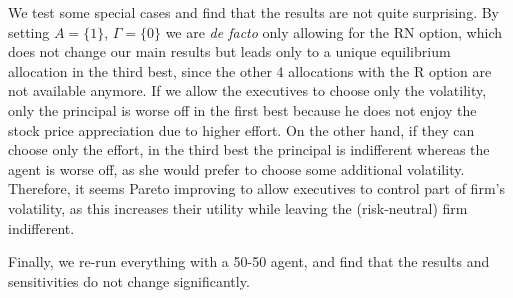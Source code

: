 We test some special cases and find that the results are not quite surprising. By setting $A=\{1\}$, $\Gamma=\{0\}$ we are \textit{de facto} only allowing for the RN option, which does not change our main results but leads only to a unique equilibrium allocation in the third best, since the other 4 allocations with the R option are not available anymore. If we allow the executives to choose only the volatility, only the principal is worse off in the first best because he does not enjoy the stock price appreciation due to higher effort. On the other hand, if they can choose only the effort,  in the third best the principal is indifferent whereas the agent is worse off, as she would prefer to choose some additional volatility. Therefore, it seems Pareto improving to allow executives to control part of firm's volatility, as this increases their utility while leaving the (risk-neutral) firm indifferent. 

Finally, we re-run everything with a 50-50 agent, and find that the results and sensitivities do not change significantly.